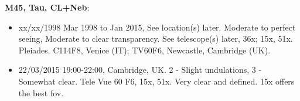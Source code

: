 {\bf M45, Tau, CL+Neb}:
\begin{itemize}
\item xx/xx/1998 Mar 1998 to Jan 2015, See location(s) later. Moderate to perfect seeing, Moderate to clear transparency. See telescope(s) later, 36x; 15x, 51x. Pleiades. C114F8, Venice (IT); TV60F6, Newcastle, Cambridge (UK).
\item 22/03/2015 19:00-22:00, Cambridge, UK. 2 - Slight undulations, 3 - Somewhat clear. Tele Vue 60 F6, 15x, 51x. Very clear and defined. 15x offers the best fov.
\end{itemize}
